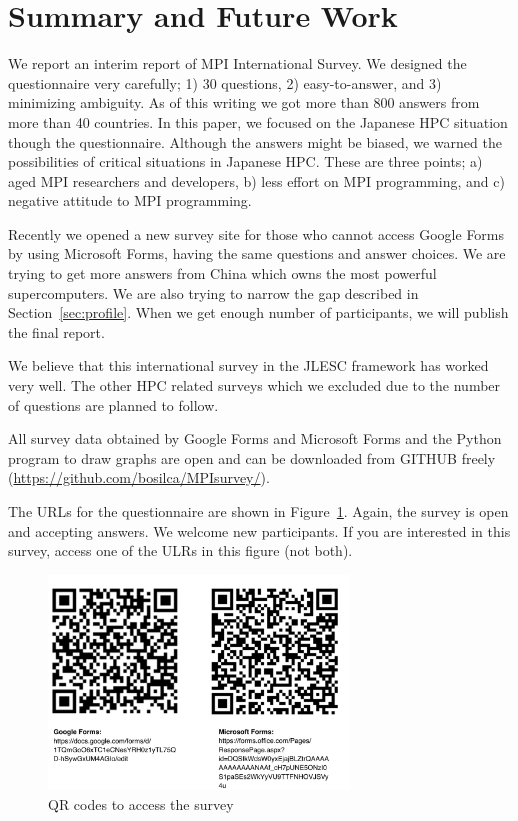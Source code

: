 \documentclass[submit,techrep,noauthor,english]{ipsj}
\begin{document}
\section{Summary and Future Work}

We report an interim report of MPI International Survey. We designed
the questionnaire very carefully; 1) 30 questions, 2) easy-to-answer,
and 3) minimizing ambiguity. As of this writing we got more than 800
answers from more than 40 countries. In this paper, we focused on the
Japanese HPC situation though the questionnaire. Although the answers
might be biased, we warned the possibilities of critical situations
in Japanese HPC. These are three points; a) aged MPI researchers and
developers, b) less effort on MPI programming, and c) negative
attitude to MPI programming. 

Recently we opened a new survey site for those who cannot access
Google Forms by using Microsoft Forms, having the same questions and
answer choices. We are trying to get more answers from China which owns
the most powerful supercomputers. We are also trying to narrow the gap
described in Section~\ref{sec:profile}. When we get enough number of
participants, we will publish the final report.

We believe that this international survey in the JLESC framework has
worked very well.  The other HPC related surveys which we excluded due
to the number of questions are planned to follow.

All survey data obtained by Google Forms and Microsoft Forms and the
Python program to draw graphs are open and can be downloaded from
GITHUB freely (\url{https://github.com/bosilca/MPIsurvey/}).

The URLs for the questionnaire are shown in
Figure~\ref{fig:QR-codes}. Again, the survey is open and accepting
answers. We welcome new participants. If you are interested in
this survey, access one of the ULRs in this figure (not both).

\begin{figure}[htb]
\begin{center}
\includegraphics[width=8cm]{figs/QR-codes.pdf}
\caption{QR codes to access the survey}
\label{fig:QR-codes}
\end{center}
\end{figure}
\end{document}
